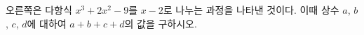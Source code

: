 \noindent\begin{minipage}[t]{0.58\linewidth}\vspace{0pt}\raggedright 오른쪽은 다항식 $x^3+2x^2-9$를 $x-2$로 나누는 과정을 나타낸 것이다. 이때 상수 $a$, $b$, $c$, $d$에 대하여 $a+b+c+d$의 값을 구하시오.\end{minipage}\hfill\begin{minipage}[t]{0.4\linewidth}\vspace{0pt}\centering \resizebox{\ifdim\width>\linewidth\linewidth\else\width\fi}{!}{}\end{minipage}\par
